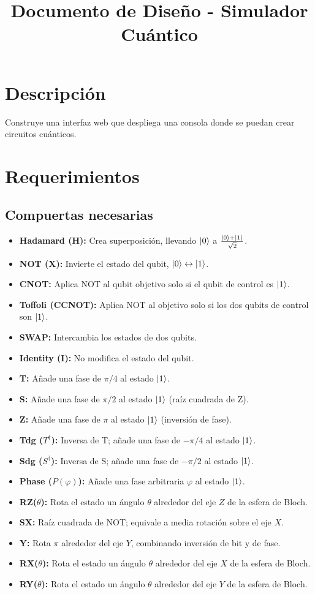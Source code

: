 \documentclass{article}
\title{Documento de Diseño - Simulador Cuántico}
\begin{document}
\author{}
\date{}

\maketitle

\section{Descripción}
Construye una interfaz web que despliega una consola donde se puedan crear circuitos cuánticos.

\section{Requerimientos}
\subsection{Compuertas necesarias}
\begin{itemize}
  \item \textbf{Hadamard (H):} Crea superposición, llevando $\ket{0}$ a $\frac{\ket{0}+\ket{1}}{\sqrt{2}}$.
  \item \textbf{NOT (X):} Invierte el estado del qubit, $\ket{0}\leftrightarrow\ket{1}$.
  \item \textbf{CNOT:} Aplica NOT al qubit objetivo solo si el qubit de control es $\ket{1}$.
  \item \textbf{Toffoli (CCNOT):} Aplica NOT al objetivo solo si los dos qubits de control son $\ket{1}$.
  \item \textbf{SWAP:} Intercambia los estados de dos qubits.
  \item \textbf{Identity (I):} No modifica el estado del qubit.
  \item \textbf{T:} Añade una fase de $\pi/4$ al estado $\ket{1}$.
  \item \textbf{S:} Añade una fase de $\pi/2$ al estado $\ket{1}$ (raíz cuadrada de Z).
  \item \textbf{Z:} Añade una fase de $\pi$ al estado $\ket{1}$ (inversión de fase).
  \item \textbf{Tdg ($T^\dagger$):} Inversa de T; añade una fase de $-\pi/4$ al estado $\ket{1}$.
  \item \textbf{Sdg ($S^\dagger$):} Inversa de S; añade una fase de $-\pi/2$ al estado $\ket{1}$.
  \item \textbf{Phase ($P(\varphi)$):} Añade una fase arbitraria $\varphi$ al estado $\ket{1}$.
  \item \textbf{RZ($\theta$):} Rota el estado un ángulo $\theta$ alrededor del eje $Z$ de la esfera de Bloch.
  \item \textbf{SX:} Raíz cuadrada de NOT; equivale a media rotación sobre el eje $X$.
  \item \textbf{Y:} Rota $\pi$ alrededor del eje $Y$, combinando inversión de bit y de fase.
  \item \textbf{RX($\theta$):} Rota el estado un ángulo $\theta$ alrededor del eje $X$ de la esfera de Bloch.
  \item \textbf{RY($\theta$):} Rota el estado un ángulo $\theta$ alrededor del eje $Y$ de la esfera de Bloch.
\end{itemize}
\end{document}

